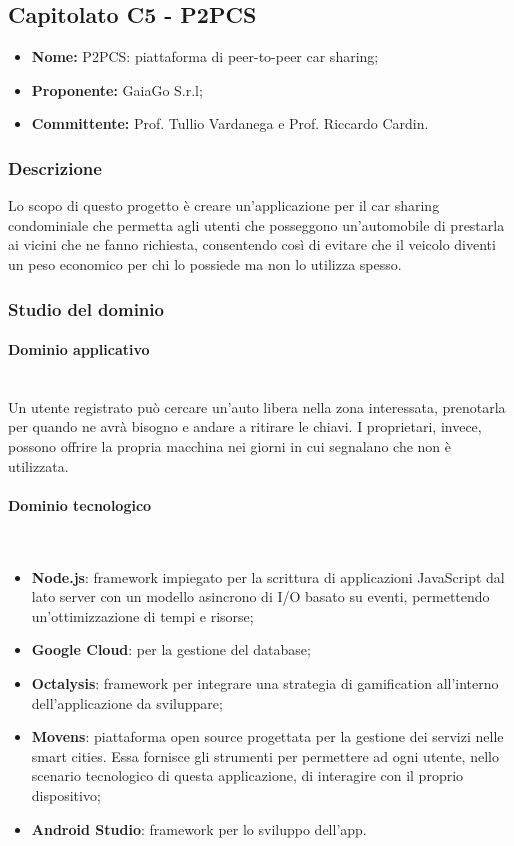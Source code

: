 \subsection{Capitolato C5 - P2PCS}
\begin{itemize}
\item \textbf{Nome:} P2PCS: piattaforma di peer-to-peer car sharing;
\item \textbf{Proponente:} GaiaGo S.r.l;
\item \textbf{Committente:} Prof. Tullio Vardanega e Prof. Riccardo Cardin.
\end{itemize}
\subsubsection{Descrizione}
Lo scopo di questo progetto è creare un'applicazione per il car sharing 
condominiale che permetta agli utenti che posseggono un'automobile di prestarla 
ai vicini che ne fanno richiesta, consentendo così di evitare che il veicolo 
diventi un peso economico per chi lo possiede ma non lo utilizza spesso.

\subsubsection{Studio del dominio}
\paragraph{Dominio applicativo} \mbox{}\\
Un utente registrato può cercare un'auto libera nella zona interessata, 
prenotarla per quando ne avrà bisogno e andare a ritirare le chiavi. I 
proprietari, invece, possono offrire la propria macchina nei giorni in cui 
segnalano che non è utilizzata.

\paragraph{Dominio tecnologico} \mbox{}\\
\begin{itemize}
	\item \textbf{Node.js}: framework impiegato per la scrittura di applicazioni 
JavaScript dal lato server con un modello asincrono di I/O basato su eventi, 
permettendo un'ottimizzazione di tempi e risorse;
	\item \textbf{Google Cloud}: per la gestione del database;
	\item \textbf{Octalysis}: framework per integrare una strategia di gamification 
all'interno dell'applicazione da sviluppare;
	\item \textbf{Movens}: piattaforma open source progettata per la gestione dei 
servizi nelle smart cities. Essa fornisce gli strumenti per permettere ad ogni 
	utente, nello scenario tecnologico di questa applicazione, di interagire con il 
proprio dispositivo;
	\item \textbf{Android Studio}: framework per lo sviluppo dell'app.
\end{itemize}

